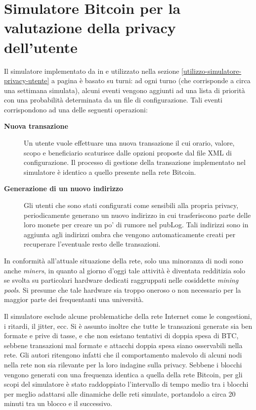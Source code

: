 \chapter{Simulatore Bitcoin per la valutazione della privacy dell'utente}

Il simulatore implementato da in \cite{user-privacy} e utilizzato nella sezione \ref{utilizzo-simulatore-privacy-utente} a pagina \pageref{utilizzo-simulatore-privacy-utente} è basato su turni: ad ogni turno (che corrisponde a circa una settimana simulata), alcuni eventi vengono aggiunti ad una lista di priorità con una probabilità determinata da un file di configurazione.
Tali eventi corrispondono ad una delle seguenti operazioni:

\begin{description}
    \item[\textbf{Nuova transazione}]
      Un utente vuole effettuare una nuova transazione il cui orario, valore, scopo e beneficiario scaturisce dalle opzioni proposte dal file XML di configurazione. Il processo di gestione della transazione implementato nel simulatore è identico a quello presente nella rete Bitcoin.
    \item[\textbf{Generazione di un nuovo indirizzo}]
      Gli utenti che sono stati configurati come sensibili alla propria privacy, periodicamente generano un nuovo indirizzo in cui trasferiscono parte delle loro monete per creare un po' di rumore nel pubLog. Tali indirizzi sono in aggiunta agli indirizzi ombra che vengono automaticamente creati per recuperare l'eventuale resto delle transazioni.
\end{description}

In conformità all'attuale situazione della rete, solo una minoranza di nodi sono anche \emph{miners}, in quanto al giorno d'oggi tale attività è diventata redditizia solo se svolta su particolari hardware dedicati raggruppati nelle cosiddette \emph{mining pools}. Si presume che tale hardware sia troppo oneroso o non necessario per la maggior parte dei frequentanti una università.

Il simulatore esclude alcune problematiche della rete Internet come le congestioni, i ritardi, il jitter, ecc.
Si è assunto inoltre che tutte le transazioni generate sia ben formate e prive di tasse, e che non esistano tentativi di doppia spesa di BTC, sebbene transazioni mal formate e attacchi doppia spesa siano osservabili nella rete.
Gli autori ritengono infatti che il comportamento malevolo di alcuni nodi nella rete non sia rilevante per la loro indagine sulla privacy.
Sebbene i blocchi vengono generati con una frequenza identica a quella della rete Bitcoin, per gli scopi del simulatore è stato raddoppiato l'intervallo di tempo medio tra i blocchi per meglio adattarsi alle dinamiche delle reti simulate, portandolo a circa 20 minuti tra un blocco e il successivo.

